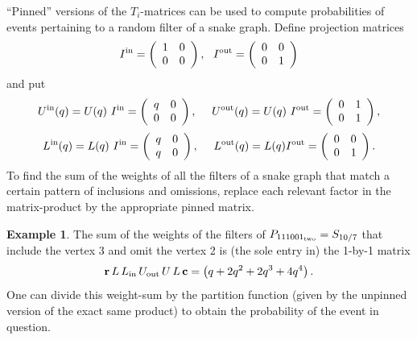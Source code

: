 \documentclass[12pt]{article}
\theoremstyle{plain}
\theoremstyle{definition}
\newtheorem{example}[theorem]{Example}
\theoremstyle{remark}
\newcommand{\QQ}{{\mathds Q}}
\begin{document}
``Pinned'' versions of the $T_i$-matrices can be used
to compute probabilities of events pertaining to
a random filter of a snake graph. Define projection matrices
$$I^{{\rm in}}  = \left(\begin{array}{cc} 1 & 0 \\ 0 & 0 \end{array} \right), \ 
\ I^{{\rm out}} = \left(\begin{array}{cc} 0 & 0 \\ 0 & 1 \end{array} \right)$$
and put
$$U^{{\rm in}}(q)  = U(q) \ I^{{\rm in}}  
= \left(\begin{array}{cc} q & 0 \\ 0 & 0 \end{array} \right), 
\ \ \ \ U^{{\rm out}}(q) = U(q) \ I^{{\rm out}} 
= \left(\begin{array}{cc} 0 & 1 \\ 0 & 1 \end{array} \right),$$
$$L^{{\rm in}}(q)  = L(q) \ I^{{\rm in}}  
= \left(\begin{array}{cc} q & 0 \\ q & 0 \end{array} \right), 
\ \ \ \ L^{{\rm out}}(q) = L(q) I^{{\rm out}} 
= \left(\begin{array}{cc} 0 & 0 \\ 0 & 1 \end{array} \right).$$
To find the sum of the weights of all the filters of a snake graph
that match a certain pattern of inclusions and omissions,
replace each relevant factor in the matrix-product
by the appropriate pinned matrix.

\begin{example}
The sum of the weights of the filters of $P_{111001_{{\rm two}}} = S_{10/7}$
that include the vertex 3 and omit the vertex 2
is (the sole entry in) the 1-by-1 matrix
$${\bf r} \, L \, L_{{\rm in}} \, 
U_{{\rm out}} \, U \, L \, {\bf c} = 
\left( q+2q^2+2q^3+4q^4 \right) . $$
One can divide this weight-sum by the partition function
(given by the unpinned version of the exact same product)
to obtain the probability of the event in question.
\end{example}

\end{document}
